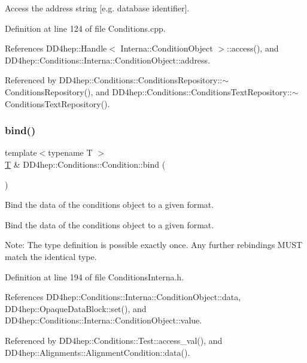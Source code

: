 Access the address string \mbox{[}e.\+g. database identifier\mbox{]}. 



Definition at line 124 of file Conditions.\+cpp.



References D\+D4hep\+::\+Handle$<$ Interna\+::\+Condition\+Object $>$\+::access(), and D\+D4hep\+::\+Conditions\+::\+Interna\+::\+Condition\+Object\+::address.



Referenced by D\+D4hep\+::\+Conditions\+::\+Conditions\+Repository\+::$\sim$\+Conditions\+Repository(), and D\+D4hep\+::\+Conditions\+::\+Conditions\+Text\+Repository\+::$\sim$\+Conditions\+Text\+Repository().

\hypertarget{class_d_d4hep_1_1_conditions_1_1_condition_a6f30850ed25383e679d88509c0597211}{}\label{class_d_d4hep_1_1_conditions_1_1_condition_a6f30850ed25383e679d88509c0597211} 
\subsubsection{\texorpdfstring{bind()}{bind()}}
{\footnotesize\ttfamily template$<$typename T $>$ \\
\hyperlink{class_t}{T} \& D\+D4hep\+::\+Conditions\+::\+Condition\+::bind (\begin{DoxyParamCaption}{ }\end{DoxyParamCaption})}



Bind the data of the conditions object to a given format. 

Bind the data of the conditions object to a given format.

Note\+: The type definition is possible exactly once. Any further rebindings M\+U\+ST match the identical type. 

Definition at line 194 of file Conditions\+Interna.\+h.



References D\+D4hep\+::\+Conditions\+::\+Interna\+::\+Condition\+Object\+::data, D\+D4hep\+::\+Opaque\+Data\+Block\+::set(), and D\+D4hep\+::\+Conditions\+::\+Interna\+::\+Condition\+Object\+::value.



Referenced by D\+D4hep\+::\+Conditions\+::\+Test\+::access\+\_\+val(), and D\+D4hep\+::\+Alignments\+::\+Alignment\+Condition\+::data().

